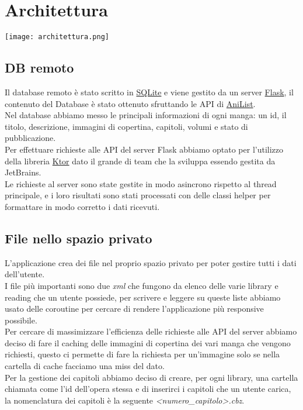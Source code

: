 \documentclass[../Assignment-3-LPSMT.tex]{subfiles}
\begin{document}
\chapter{Architettura}

\begin{center}
  \texttt{[image: architettura.png]}
\end{center}

\section{DB remoto}

Il database remoto è stato scritto in \href{https://www.sqlite.org/index.html}{SQLite} e viene gestito da un server \href{https://flask.palletsprojects.com/en/2.3.x/}{Flask}, il contenuto del Database è stato ottenuto sfruttando le API di \href{https://anilist.gitbook.io/anilist-apiv2-docs/}{AniList}.\\
Nel database abbiamo messo le principali informazioni di ogni manga: un id, il titolo, descrizione, immagini di copertina, capitoli, volumi e stato di pubblicazione.\\
Per effettuare richieste alle API del server Flask abbiamo optato per l'utilizzo della libreria \href{https://ktor.io/}{Ktor} dato il grande di team che la sviluppa essendo gestita da JetBrains.\\
Le richieste al server sono state gestite in modo asincrono rispetto al thread principale, e i loro risultati sono stati processati con delle classi helper per formattare in modo corretto i dati ricevuti.\\

\section{File nello spazio privato}

L'applicazione crea dei file nel proprio spazio privato per poter gestire tutti i dati dell'utente.\\
I file più importanti sono due \emph{xml} che fungono da elenco delle varie library e reading che un utente possiede, per scrivere e leggere su queste liste abbiamo usato delle coroutine per cercare di rendere l'applicazione più responsive possibile.\\
Per cercare di massimizzare l'efficienza delle richieste alle API del server abbiamo deciso di fare il caching delle immagini di copertina dei vari manga che vengono richiesti, questo ci permette di fare la richiesta per un'immagine solo se nella cartella di cache facciamo una miss del dato.\\
Per la gestione dei capitoli abbiamo deciso di creare, per ogni library, una cartella chiamata come l'id dell'opera stessa e di inserirci i capitoli che un utente carica, la nomenclatura dei capitoli è la seguente \emph{<numero\_capitolo>.cbz}.
\end{document}
